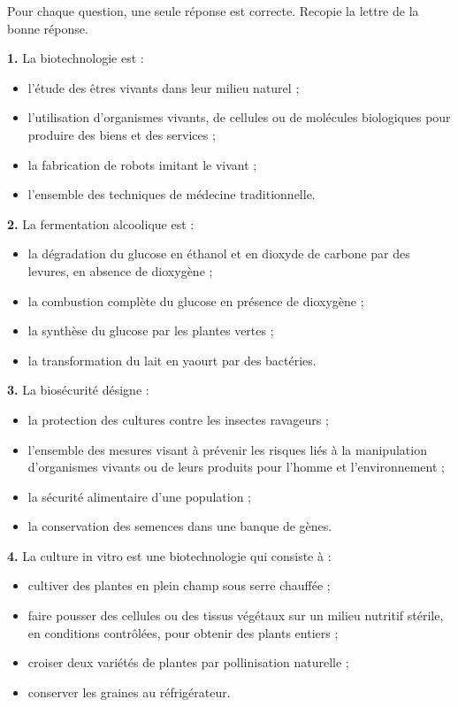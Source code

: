 \documentclass[11pt]{article}
\begin{document}
\begin{exercice}
Pour chaque question, une seule réponse est correcte. Recopie la lettre de la bonne réponse.

\textbf{1.} La biotechnologie est :
\begin{itemize}
\item[a)] l'étude des êtres vivants dans leur milieu naturel ;
\item[b)] l'utilisation d'organismes vivants, de cellules ou de molécules biologiques pour produire des biens et des services ;
\item[c)] la fabrication de robots imitant le vivant ;
\item[d)] l'ensemble des techniques de médecine traditionnelle.
\end{itemize}

\textbf{2.} La fermentation alcoolique est :
\begin{itemize}
\item[a)] la dégradation du glucose en éthanol et en dioxyde de carbone par des levures, en absence de dioxygène ;
\item[b)] la combustion complète du glucose en présence de dioxygène ;
\item[c)] la synthèse du glucose par les plantes vertes ;
\item[d)] la transformation du lait en yaourt par des bactéries.
\end{itemize}

\textbf{3.} La biosécurité désigne :
\begin{itemize}
\item[a)] la protection des cultures contre les insectes ravageurs ;
\item[b)] l'ensemble des mesures visant à prévenir les risques liés à la manipulation d'organismes vivants ou de leurs produits pour l'homme et l'environnement ;
\item[c)] la sécurité alimentaire d'une population ;
\item[d)] la conservation des semences dans une banque de gènes.
\end{itemize}

\textbf{4.} La culture in vitro est une biotechnologie qui consiste à :
\begin{itemize}
\item[a)] cultiver des plantes en plein champ sous serre chauffée ;
\item[b)] faire pousser des cellules ou des tissus végétaux sur un milieu nutritif stérile, en conditions contrôlées, pour obtenir des plants entiers ;
\item[c)] croiser deux variétés de plantes par pollinisation naturelle ;
\item[d)] conserver les graines au réfrigérateur.
\end{itemize}
\end{exercice}
\end{document}
